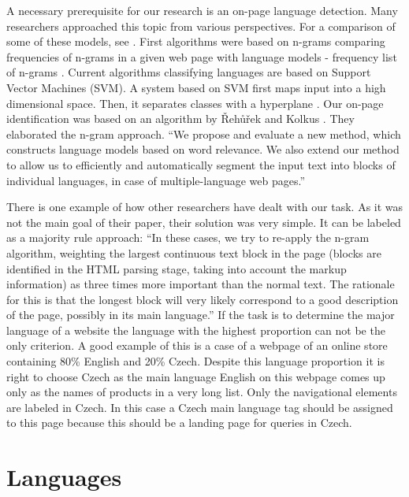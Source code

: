 \documentclass{acm_proc_article-sp}
\begin{document}
  A necessary prerequisite for our research is an on-page language detection. Many researchers approached this topic
  from various perspectives. For a comparison of some of these models, see \cite{Baldwin:shortlong}. 
  First algorithms were based on n-grams comparing frequencies of n-grams in a given web page with 
  language models - frequency list of n-grams \cite{trenkle:ngram}. Current algorithms classifying languages 
  are based on Support Vector Machines (SVM). A system based on SVM first maps input into a high dimensional space. 
  Then, it separates classes with a hyperplane \cite{Campbell:supportvector, Lodhi:textclass}.
  Our on-page identification was based on an algorithm by Řehůřek and Kolkus \cite{Rehurek:languageidentification}.  They elaborated the n-gram approach. 
  “We propose and evaluate a new method, which constructs language models based on word relevance. We also 
  extend our method to allow us to efficiently and automatically segment the input text into blocks of individual 
  languages, in case of multiple-language web pages.” \cite{Rehurek:languageidentification}
  
  
  There is one example of how other researchers have dealt with our task. As it was not the main goal of 
  their paper, their solution was very simple. It can be labeled as a majority rule approach:
  “In these cases, we try to re-apply the n-gram algorithm, weighting the largest continuous text block in the page 
  (blocks are identified in the HTML parsing stage, taking into account the markup information) as three times more important 
  than the normal text. The rationale for this is that the longest block will very likely correspond to a good description 
  of the page, possibly in its main language.” \cite{Martins:langidentweb} 
  If the task is to determine the major language of a website 
  the language with the highest proportion can not be the only criterion. A good example of this is a case of a webpage of an online store
  containing 80\% English and 20\% Czech. Despite this language proportion it is right to choose Czech as the main language
  English on this webpage comes up only as the names of products in a very long list. Only the navigational elements are labeled in Czech. In this case 
  a Czech main language tag should be assigned to this page because this should be a landing page for queries in Czech.

\section{Languages}
\end{document}
